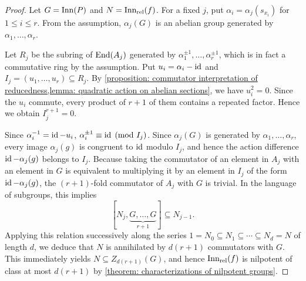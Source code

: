 
\begin{proof}
Let $G=\operatorname{Inn}(P)$ and $N=\operatorname{Inn_{rel}}(f)$.
For a fixed $j$, put $\alpha_i=\alpha_j(s_{x_i})$ for $1\leq i\leq r$. From the assumption, $\alpha_j(G)$ is an abelian group generated by $\alpha_1,\ldots,\alpha_r$.

Let $R_j$ be the subring of $\operatorname{End}(A_j)$ generated by $\alpha_1^{\pm1},\ldots,\alpha_r^{\pm1}$, which is in fact a commutative ring by the assumption. Put $u_i=\alpha_i-\operatorname{id}$ and $I_j=(u_1,\ldots,u_r)\subseteq R_j$. By \cref{proposition: commutator interpretation of reducedness,lemma: quadratic action on abelian sections}, we have $u_i^2=0$. Since the $u_i$ commute, every product of $r+1$ of them contains a repeated factor. Hence we obtain $I_j^{r+1}=0$.

Since $\alpha_i^{-1}=\operatorname{id}-u_i$, $\alpha_i^{\pm1} \equiv\operatorname{id} \pmod{I_j}$. Since $\alpha_j(G)$ is generated by $\alpha_1,\ldots,\alpha_r$, every image $\alpha_j(g)$ is congruent to $\operatorname{id}$ modulo $I_j$, and hence the action difference $\operatorname{id} - \alpha_j(g)$ belongs to $I_j$.
Because taking the commutator of an element in $A_j$ with an element in $G$ is equivalent to multiplying it by an element in $I_j$ of the form $\operatorname{id} - \alpha_j(g)$, the $(r+1)$-fold commutator of $A_j$ with $G$ is trivial. In the language of subgroups, this implies
\[  [N_j, \underbrace{G, \dots, G}_{r+1}] \subseteq N_{j-1}.\]
Applying this relation successively along the series $1 = N_0 \subseteq N_1 \subseteq \cdots \subseteq N_d = N$ of length $d$, we deduce that $N$ is annihilated by $d(r+1)$ commutators with $G$. This immediately yields $N\subseteq Z_{d(r+1)}(G)$, and hence $\operatorname{Inn_{rel}}(f)$ is nilpotent of class at most $d(r+1)$ by \cref{theorem: characterizations of nilpotent groups}. 
\end{proof}



